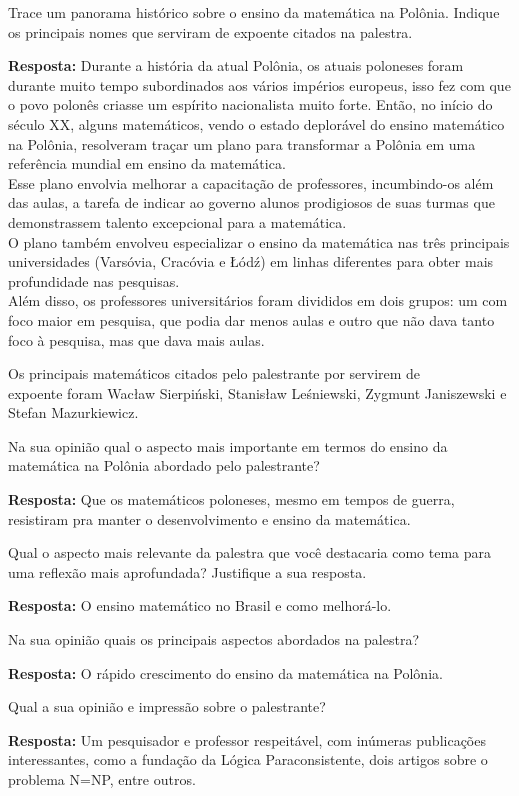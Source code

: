 \documentclass{article}
\begin{document}
\begin{enumerate}

{\bf \item Trace um panorama histórico sobre o ensino da matemática na Polônia. Indique os principais nomes que serviram de expoente citados na palestra.}

{\bf Resposta:} Durante a história da atual Polônia, os atuais poloneses foram durante muito tempo subordinados aos vários impérios europeus, isso fez com que o povo polonês criasse um espírito nacionalista muito forte. Então, no início do século XX, alguns matemáticos, vendo o estado deplorável do ensino matemático na Polônia, resolveram traçar um plano para transformar a Polônia em uma referência mundial em ensino da matemática.
\\Esse plano envolvia melhorar a capacitação de professores, incumbindo-os além das aulas, a tarefa de indicar ao governo alunos prodigiosos de suas turmas que demonstrassem talento excepcional para a matemática.
\\O plano também envolveu especializar o ensino da matemática nas três principais universidades (Varsóvia, Cracóvia e Łódź) em linhas diferentes para obter mais profundidade nas pesquisas.
\\Além disso, os professores universitários foram divididos em dois grupos: um com foco maior em pesquisa, que podia dar menos aulas e outro que não dava tanto foco à pesquisa, mas que dava mais aulas.

Os principais matemáticos citados pelo palestrante por servirem de \\expoente foram Wacław Sierpiński, Stanisław Leśniewski, Zygmunt Janiszewski e Stefan Mazurkiewicz. 


{\bf \item Na sua opinião qual o aspecto mais importante em termos do ensino da matemática na Polônia abordado pelo palestrante?}

{\bf Resposta:} Que os matemáticos poloneses, mesmo em tempos de guerra, resistiram pra manter o desenvolvimento e ensino da matemática.

{\bf \item Qual o aspecto mais relevante da palestra que você destacaria como tema para uma reflexão mais aprofundada? Justifique a sua resposta.}

{\bf Resposta:} O ensino matemático no Brasil e como melhorá-lo.

{\bf \item Na sua opinião quais os principais aspectos abordados na palestra?}

{\bf Resposta:} O rápido crescimento do ensino da matemática na Polônia.

{\bf \item Qual a sua opinião e impressão sobre o palestrante?}

{\bf Resposta:} Um pesquisador e professor respeitável, com inúmeras publicações interessantes, como a fundação da Lógica Paraconsistente, dois artigos sobre o problema N=NP, entre outros.

\end{enumerate}
\end{document}
